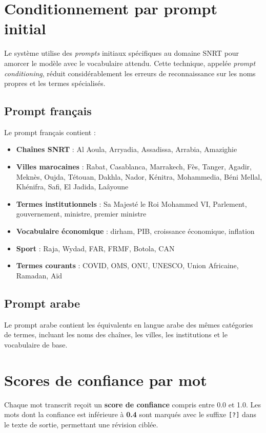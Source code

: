 \documentclass[12pt,a4paper]{report}
\begin{document}
\section{Conditionnement par prompt initial}

Le système utilise des \textit{prompts} initiaux spécifiques au domaine SNRT pour amorcer le modèle avec le vocabulaire attendu. Cette technique, appelée \textit{prompt conditioning}, réduit considérablement les erreurs de reconnaissance sur les noms propres et les termes spécialisés.

\subsection{Prompt français}

Le prompt français contient :
\begin{itemize}
    \item \textbf{Chaînes SNRT} : Al Aoula, Arryadia, Assadissa, Arrabia, Amazighie
    \item \textbf{Villes marocaines} : Rabat, Casablanca, Marrakech, Fès, Tanger, Agadir, Meknès, Oujda, Tétouan, Dakhla, Nador, Kénitra, Mohammedia, Béni Mellal, Khénifra, Safi, El Jadida, Laâyoune
    \item \textbf{Termes institutionnels} : Sa Majesté le Roi Mohammed VI, Parlement, gouvernement, ministre, premier ministre
    \item \textbf{Vocabulaire économique} : dirham, PIB, croissance économique, inflation
    \item \textbf{Sport} : Raja, Wydad, FAR, FRMF, Botola, CAN
    \item \textbf{Termes courants} : COVID, OMS, ONU, UNESCO, Union Africaine, Ramadan, Aïd
\end{itemize}

\subsection{Prompt arabe}

Le prompt arabe contient les équivalents en langue arabe des mêmes catégories de termes, incluant les noms des chaînes, les villes, les institutions et le vocabulaire de base.

\section{Scores de confiance par mot}

Chaque mot transcrit reçoit un \textbf{score de confiance} compris entre 0.0 et 1.0. Les mots dont la confiance est inférieure à \textbf{0.4} sont marqués avec le suffixe \texttt{[?]} dans le texte de sortie, permettant une révision ciblée.
\end{document}
